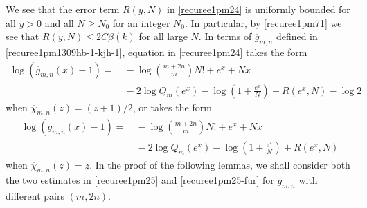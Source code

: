 \documentclass[12pt]{amsart}
\numberwithin{equation}{section}
\begin{document}
We see that the error term $R(y,N)$ in \eqref{recuree1pm24} is uniformly bounded for all $y>0$ and all $N\geq N_0$ for an integer $N_0$. In particular, by \eqref{recuree1pm71} we see that $R(y,N)\leq 2C\beta(k)$ for all large $N$. In terms of $\overline{g}_{m,n}$ defined in \eqref{recuree1pm1309hb-1-kjh-1}, equation in \eqref{recuree1pm24} takes the form
\begin{equation}\label{recuree1pm25}
\begin{split}
\log(\overline{g}_{m,n}(x)-1)=&\ -\log \binom{m+2n}{m} N!+e^x+Nx\\
&\ -2\log Q_m(e^x)-\log\left(1+\frac{e^x}{N}\right)+R(e^x,N)-\log 2
\end{split}
\end{equation}
when $\overline{\chi}_{m,n}(z)=(z+1)/2$, or takes the form
\begin{equation}\label{recuree1pm25-fur}
\begin{split}
\log(\overline{g}_{m,n}(x)-1)=&\ -\log \binom{m+2n}{m} N!+e^x+Nx\\
&\ -2\log Q_m(e^x)-\log\left(1+\frac{e^x}{N}\right)+R(e^x,N)
\end{split}
\end{equation}
when $\overline{\chi}_{m,n}(z)=z$. In the proof of the following lemmas, we shall consider both the two estimates in \eqref{recuree1pm25} and \eqref{recuree1pm25-fur} for $\overline{g}_{m,n}$ with different pairs $(m,2n)$.
\end{document}
